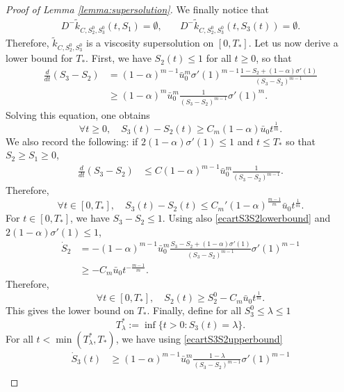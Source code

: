 \documentclass[10pt,a4paper]{amsart}
\newcommand{\al}{\alpha}
\begin{document}
\begin{proof}[Proof of Lemma \ref{lemma:supersolution}]
We finally notice that
\begin{align*}
     D^{-}\tilde k_{C,S_2^0,S_3^0}(t,S_1) = \emptyset, 
    & \quad D^{-}\tilde k_{C,S_2^0,S_3^0}(t,S_3(t)) = \emptyset.
\end{align*}
Therefore, $\tilde k_{C,S_2^0,S_3^0}$ is a viscosity supersolution on $[0,T_*]$. Let us now derive a lower bound for $T_*$. 
First, we have $S_2(t)\le 1$ for all $t\ge 0$, so that
\begin{align*}
    \frac{d}{dt}(S_3-S_2) &= (1-\al)^{m-1}\bar u_0^m  \sigma'(1)^{m-1} \frac{1-S_2 + (1-\al)\sigma'(1)}{(S_3-S_2)^{m-1}} \\
    &\ge (1-\al)^{m}\bar u_0^m \frac{1 }{(S_3-S_2)^{m-1}}\sigma'(1)^{m}.
\end{align*}
Solving this equation, one obtains
\begin{equation}\label{ecartS3S2lowerbound}
    \forall t\ge 0, \quad S_3(t)-S_2(t) \ge C_m(1-\al) \bar u_0 t^\frac{1}{m}.
\end{equation}
We also record the following: if $2(1-\al)\sigma'(1)\le 1$ and $t\le T_*$ so that $S_2\ge S_1\ge0$,
\begin{align*}
    \frac{d}{dt}(S_3-S_2) 
    &\le C(1-\al)^{m-1}\bar u_0^m  \frac{1}{(S_3-S_2)^{m-1}}.
\end{align*}
Therefore,
\begin{equation}\label{ecartS3S2upperbound}
   \forall t\in [0,T_*],\quad  S_3(t)-S_2(t)\le  C_m'(1-\al)^{\frac{m-1}{m}}\bar u_0 t^\frac{1}{m}.
\end{equation}
For $t\in [0,T_*]$, we have $S_3-S_2 \le 1$. Using also \eqref{ecartS3S2lowerbound} and $2(1-\al)\sigma'(1)\le 1$,
\begin{align*}
    \dot S_2 &= -(1-\al)^{m-1}\bar u_0^m \frac{S_3-S_2 + (1-\al)\sigma'(1) }{(S_3-S_2)^{m-1}}\sigma'(1)^{m-1} \\
    &\ge -C_m \bar u_0 t^{-\frac{m-1}{m}}.
\end{align*}
Therefore,
\begin{equation*}
   \forall t\in [0,T_*],\quad  S_2(t) \ge S_2^0 -C_m \bar u_0 t^\frac{1}{m}.
\end{equation*}
This gives the lower bound on $T_*$. Finally, define for all $S_3^0 \le \lambda \le 1$
\begin{equation*}
    T_\lambda^* := \inf\{t>0 : S_3(t) = \lambda\}.
\end{equation*}
For all $t< \min(T_\lambda^*, T_*)$, we have using \eqref{ecartS3S2upperbound}
\begin{align*}
    \dot S_3(t) &\ge (1-\al)^{m-1}\bar u_0^m \frac{1-\lambda }{(S_3-S_2)^{m-1}}\sigma'(1)^{m-1}\\

\end{align*}
\end{proof}
\end{document}
